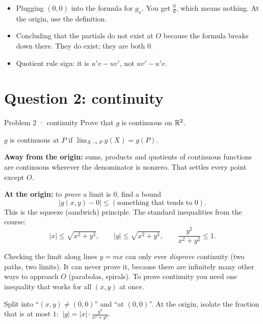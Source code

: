\begin{trap}
\begin{itemize}
  \item Plugging $(0,0)$ into the formula for $g_x$. You get $\frac00$, which means nothing. At the
        origin, use the definition.
  \item Concluding that the partials do not exist at $O$ because the formula breaks down there. They
        do exist; they are both $0$.
  \item Quotient rule sign: it is $u'v-uv'$, not $uv'-u'v$.
\end{itemize}
\end{trap}

\section{Question 2: continuity}

\begin{question}{Problem 2 \;·\; continuity}
Prove that $g$ is continuous on $\mathbb{R}^2$.
\end{question}

\begin{lesson}
$g$ is continuous at $P$ if $\displaystyle\lim_{X\to P}g(X)=g(P)$.

\textbf{Away from the origin:} sums, products and quotients of continuous functions are continuous
wherever the denominator is nonzero. That settles every point except $O$.

\textbf{At the origin:} to \emph{prove} a limit is $0$, find a bound
\[
  |g(x,y)-0|\le(\text{something that tends to }0).
\]
This is the squeeze (sandwich) principle. The standard inequalities from the course:
\[
  |x|\le\sqrt{x^2+y^2},\qquad |y|\le\sqrt{x^2+y^2},\qquad \frac{y^2}{x^2+y^2}\le1 .
\]
\end{lesson}

\begin{intuition}
Checking the limit along lines $y=mx$ can only ever \emph{disprove} continuity (two paths, two limits).
It can never prove it, because there are infinitely many other ways to approach $O$ (parabolas,
spirals). To prove continuity you need one inequality that works for all $(x,y)$ at once.
\end{intuition}

\begin{howto}
Split into ``$(x,y)\ne(0,0)$'' and ``at $(0,0)$''. At the origin, isolate the fraction that is at
most $1$: $\ |g|=|x|\cdot\frac{y^2}{x^2+y^2}$.
\end{howto}

